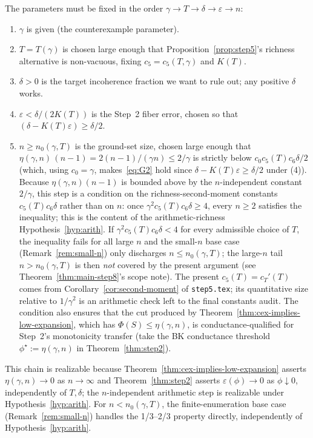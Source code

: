 \begin{remark}\label{rem:G2-order}
The parameters must be fixed in the order
$\gamma \to T \to \delta \to \varepsilon \to n$:
\begin{enumerate}[nosep, label=(\arabic*)]
 \item $\gamma$ is given (the counterexample parameter).
 \item $T = T(\gamma)$ is chosen large enough that
 Proposition~\ref{prop:step5}'s richness alternative is non-vacuous,
 fixing $c_5 = c_5(T,\gamma)$ and $K(T)$.
 \item $\delta > 0$ is the target incoherence fraction we want to rule
 out; any positive $\delta$ works.
 \item $\varepsilon < \delta / (2 K(T))$ is the Step~2 fiber error,
 chosen so that $(\delta - K(T)\varepsilon) \ge \delta/2$.
 \item $n \ge n_0(\gamma, T)$ is the ground-set size, chosen large
 enough that $\eta(\gamma, n)\,(n-1) = 2(n-1)/(\gamma n) \le 2/\gamma$
 is strictly below $c_0 c_5(T) c_6 \delta/2$ (which, using $c_0 =
 \gamma$, makes~\eqref{eq:G2} hold since $\delta - K(T)\varepsilon \ge
 \delta/2$ under (4)). Because $\eta(\gamma,n)(n-1)$ is bounded above
 by the $n$-independent constant $2/\gamma$, this step is a condition
 on the richness-second-moment constants $c_5(T) c_6 \delta$ rather
 than on $n$: once $\gamma^2 c_5(T) c_6 \delta \ge 4$, every
 $n \ge 2$ satisfies the inequality; this is the content of the
 arithmetic-richness Hypothesis~\ref{hyp:arith}. If
 $\gamma^2 c_5(T) c_6 \delta < 4$ for every admissible choice of
 $T$, the inequality fails for all large $n$ and the small-$n$ base
 case (Remark~\ref{rem:small-n}) only discharges
 $n \le n_0(\gamma, T)$; the large-$n$ tail
 $n > n_0(\gamma, T)$ is then \emph{not} covered by the present
 argument (see Theorem~\ref{thm:main-step8}'s scope note).
 The present $c_5(T) = c_T'(T)$ comes
 from Corollary~\ref{cor:second-moment} of \texttt{step5.tex}; its
 quantitative size relative to $1/\gamma^2$ is an arithmetic check
 left to the final constants audit. The condition also ensures that the
 cut produced by Theorem~\ref{thm:cex-implies-low-expansion}, which
 has $\Phi(S) \le \eta(\gamma, n)$, is conductance-qualified for
 Step~2's monotonicity transfer (take the BK conductance threshold
 $\phi^\star := \eta(\gamma, n)$ in Theorem~\ref{thm:step2}).
\end{enumerate}
This chain is realizable because Theorem~\ref{thm:cex-implies-low-expansion}
asserts $\eta(\gamma, n) \to 0$ as $n \to \infty$ and
Theorem~\ref{thm:step2} asserts $\varepsilon(\phi) \to 0$ as $\phi
\downarrow 0$, independently of $T, \delta$; the
$n$-independent arithmetic step is realizable under
Hypothesis~\ref{hyp:arith}. For $n < n_0(\gamma, T)$, the
finite-enumeration base case (Remark~\ref{rem:small-n}) handles
the 1/3--2/3 property directly, independently of
Hypothesis~\ref{hyp:arith}.
\end{remark}

